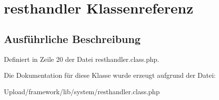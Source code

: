 \hypertarget{classresthandler}{}\section{resthandler Klassenreferenz}
\label{classresthandler}


\subsection{Ausführliche Beschreibung}


Definiert in Zeile 20 der Datei resthandler.\+class.\+php.



Die Dokumentation für diese Klasse wurde erzeugt aufgrund der Datei\+:\begin{DoxyCompactItemize}
\item 
Upload/framework/lib/system/resthandler.\+class.\+php\end{DoxyCompactItemize}
